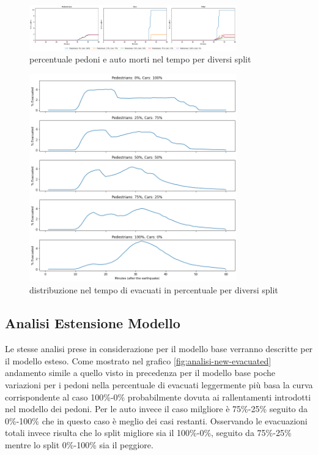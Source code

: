 \newpage
\begin{figure}[ht]
    \centering
    \includegraphics[width=0.8\textwidth]{images/analisi/base-casualties.png}
    \caption{percentuale pedoni e auto morti nel tempo per diversi split}
    \label{fig:analisi-base-casualties}
\end{figure}
%
\begin{figure}[ht]
    \centering
    \includegraphics[width=0.8\textwidth]{images/analisi/base-evtimes.png}
    \caption{distribuzione nel tempo di evacuati in percentuale per diversi split}
    \label{fig:analisi-base-evtimes}
\end{figure}

\newpage

\subsection{Analisi Estensione Modello}
Le stesse analisi prese in considerazione per il modello base verranno descritte per il modello esteso.
Come mostrato nel grafico \ref*{fig:analisi-new-evacuated} andamento simile a quello visto in precedenza per il modello base
poche variazioni per i pedoni nella percentuale di evacuati leggermente più basa la curva corrispondente al caso 100\%-0\% probabilmente dovuta
ai rallentamenti introdotti nel modello dei pedoni.
Per le auto invece il caso milgliore è 75\%-25\% seguito da 0\%-100\% che in questo caso è meglio dei casi restanti.
Osservando le evacuazioni totali invece risulta che lo split migliore sia il 100\%-0\%, seguito da 75\%-25\% mentre lo split 0\%-100\% sia il peggiore.

